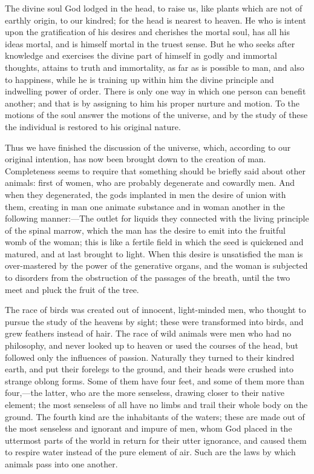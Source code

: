 \documentclass[11pt,letter]{article}
\begin{document}
\par  The divine soul God lodged in the head, to raise us, like plants which are not of earthly origin, to our kindred; for the head is nearest to heaven. He who is intent upon the gratification of his desires and cherishes the mortal soul, has all his ideas mortal, and is himself mortal in the truest sense. But he who seeks after knowledge and exercises the divine part of himself in godly and immortal thoughts, attains to truth and immortality, as far as is possible to man, and also to happiness, while he is training up within him the divine principle and indwelling power of order. There is only one way in which one person can benefit another; and that is by assigning to him his proper nurture and motion. To the motions of the soul answer the motions of the universe, and by the study of these the individual is restored to his original nature.

\par  Thus we have finished the discussion of the universe, which, according to our original intention, has now been brought down to the creation of man. Completeness seems to require that something should be briefly said about other animals: first of women, who are probably degenerate and cowardly men. And when they degenerated, the gods implanted in men the desire of union with them, creating in man one animate substance and in woman another in the following manner:—The outlet for liquids they connected with the living principle of the spinal marrow, which the man has the desire to emit into the fruitful womb of the woman; this is like a fertile field in which the seed is quickened and matured, and at last brought to light. When this desire is unsatisfied the man is over-mastered by the power of the generative organs, and the woman is subjected to disorders from the obstruction of the passages of the breath, until the two meet and pluck the fruit of the tree.

\par  The race of birds was created out of innocent, light-minded men, who thought to pursue the study of the heavens by sight; these were transformed into birds, and grew feathers instead of hair. The race of wild animals were men who had no philosophy, and never looked up to heaven or used the courses of the head, but followed only the influences of passion. Naturally they turned to their kindred earth, and put their forelegs to the ground, and their heads were crushed into strange oblong forms. Some of them have four feet, and some of them more than four,—the latter, who are the more senseless, drawing closer to their native element; the most senseless of all have no limbs and trail their whole body on the ground. The fourth kind are the inhabitants of the waters; these are made out of the most senseless and ignorant and impure of men, whom God placed in the uttermost parts of the world in return for their utter ignorance, and caused them to respire water instead of the pure element of air. Such are the laws by which animals pass into one another.
\end{document}
